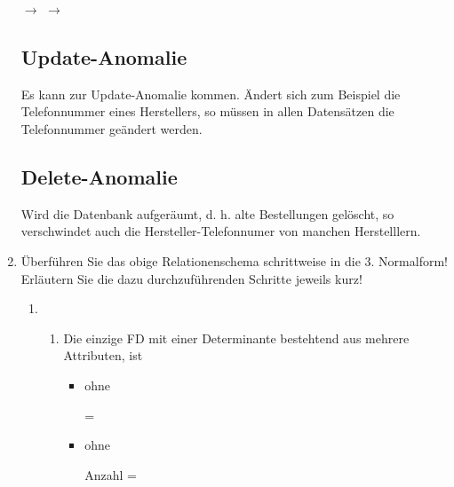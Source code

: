 \documentclass{bschlangaul-aufgabe}
\begin{document}
\begin{enumerate}
\begin{bAntwort}
\bigskip

$\rightarrow$ 
$\rightarrow$ 

\subsection*{Update-Anomalie}

Es kann zur Update-Anomalie kommen. Ändert sich zum Beispiel die
Telefonnummer eines Herstellers, so müssen in allen
Datensätzen die Telefonnummer geändert werden.

\subsection*{Delete-Anomalie}

Wird die Datenbank aufgeräumt, d. h. alte Bestellungen gelöscht,
so verschwindet auch die Hersteller-Telefonnumer von manchen
Herstelllern.
\end{bAntwort}


\item Überführen Sie das obige Relationenschema schrittweise in die 3.
Normalform! Erläutern Sie die dazu durchzuführenden Schritte jeweils
kurz!

\begin{bAntwort}

\begin{enumerate}
\item {}

\begin{enumerate}
\item {}

Die einzige FD mit einer Determinante bestehtend aus mehrere Attributen,
ist 

\begin{itemize}
\item ohne 

\begin{liAHuelle}
 \notin {} = \\
\end{liAHuelle}

\item ohne 

\begin{liAHuelle}
Anzahl \notin {} = \\
\end{liAHuelle}


\end{itemize}
\end{enumerate}
\end{enumerate}
\end{bAntwort}
\end{enumerate}
\end{document}
